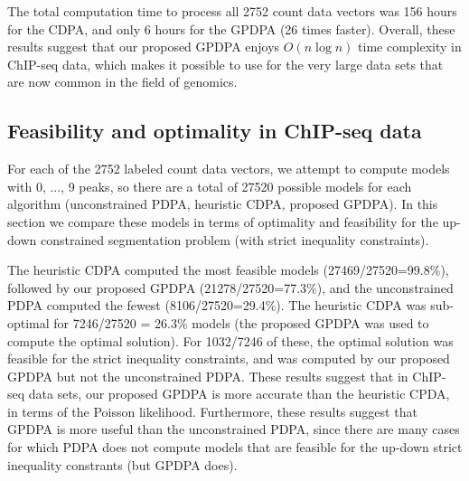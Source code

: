 \documentclass[aoas]{imsart}
\begin{document}
The total computation time to process all 2752 count data vectors was
156 hours for the CDPA, and only 6 hours for the GPDPA (26 times
faster). Overall, these results suggest that our proposed GPDPA enjoys
$O(n\log n)$ time complexity in ChIP-seq data, which makes it possible
to use for the very large data sets that are now common in the field of genomics.

\subsection{Feasibility and optimality in ChIP-seq data}

For each of the 2752 labeled count data vectors, we attempt to compute
models with 0, ..., 9 peaks, so there are a total of 27520 possible
models for each algorithm (unconstrained PDPA, heuristic CDPA,
proposed GPDPA). In this section we compare these models in terms of
optimality and feasibility for the up-down constrained segmentation
problem (with strict inequality constraints).

The heuristic CDPA computed the most feasible models
(27469/27520=99.8\%), followed by our proposed GPDPA
(21278/27520=77.3\%), and the unconstrained PDPA computed the fewest
(8106/27520=29.4\%). The heuristic CDPA was sub-optimal for 7246/27520 = 26.3\%
models (the proposed GPDPA was used to compute the optimal solution). 
For 1032/7246 of these, the optimal solution was feasible for the
strict inequality constraints, and was computed by our proposed GPDPA
but not the unconstrained PDPA. 
These results suggest that in ChIP-seq data
sets, our proposed GPDPA is more accurate than the heuristic CPDA, in terms of the Poisson likelihood. 
Furthermore, these results suggest
that GPDPA is more useful than the unconstrained PDPA, since there are
many cases for which PDPA does not compute models that are feasible
for the up-down strict inequality constrants (but GPDPA does).


\end{document}
